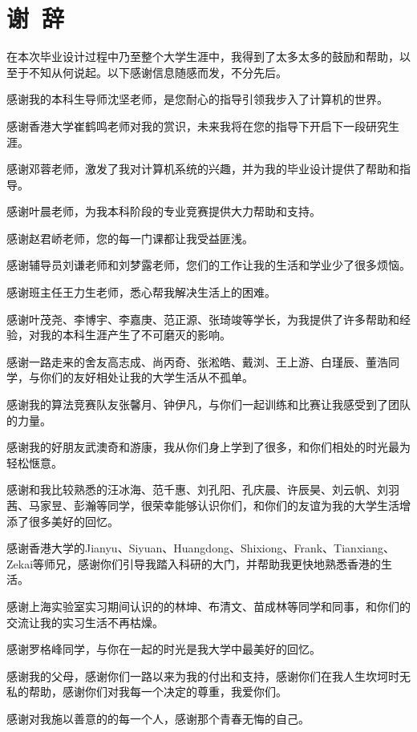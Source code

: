 \section*{谢\ 辞}

在本次毕业设计过程中乃至整个大学生涯中，我得到了太多太多的鼓励和帮助，以至于不知从何说起。以下感谢信息随感而发，不分先后。

感谢我的本科生导师沈坚老师，是您耐心的指导引领我步入了计算机的世界。

感谢香港大学崔鹤鸣老师对我的赏识，未来我将在您的指导下开启下一段研究生涯。

感谢邓蓉老师，激发了我对计算机系统的兴趣，并为我的毕业设计提供了帮助和指导。

感谢叶晨老师，为我本科阶段的专业竞赛提供大力帮助和支持。

感谢赵君峤老师，您的每一门课都让我受益匪浅。

感谢辅导员刘谦老师和刘梦露老师，您们的工作让我的生活和学业少了很多烦恼。

感谢班主任王力生老师，悉心帮我解决生活上的困难。

感谢叶茂尧、李博宇、李嘉庚、范正源、张琦竣等学长，为我提供了许多帮助和经验，对我的本科生涯产生了不可磨灭的影响。

感谢一路走来的舍友高志成、尚丙奇、张淞皓、戴浏、王上游、白瑾辰、董浩同学，与你们的友好相处让我的大学生活从不孤单。

感谢我的算法竞赛队友张馨月、钟伊凡，与你们一起训练和比赛让我感受到了团队的力量。

感谢我的好朋友武澳奇和游康，我从你们身上学到了很多，和你们相处的时光最为轻松惬意。

感谢和我比较熟悉的汪冰海、范千惠、刘孔阳、孔庆晨、许辰昊、刘云帆、刘羽茜、马家昱、彭瀚等同学，很荣幸能够认识你们，和你们的友谊为我的大学生活增添了很多美好的回忆。

感谢香港大学的Jianyu、Siyuan、Huangdong、Shixiong、Frank、Tianxiang、Zekai等师兄，感谢你们引导我踏入科研的大门，并帮助我更快地熟悉香港的生活。

感谢上海实验室实习期间认识的的林坤、布清文、苗成林等同学和同事，和你们的交流让我的实习生活不再枯燥。

感谢罗格峰同学，与你在一起的时光是我大学中最美好的回忆。

感谢我的父母，感谢你们一路以来为我的付出和支持，感谢你们在我人生坎坷时无私的帮助，感谢你们对我每一个决定的尊重，我爱你们。

感谢对我施以善意的的每一个人，感谢那个青春无悔的自己。
